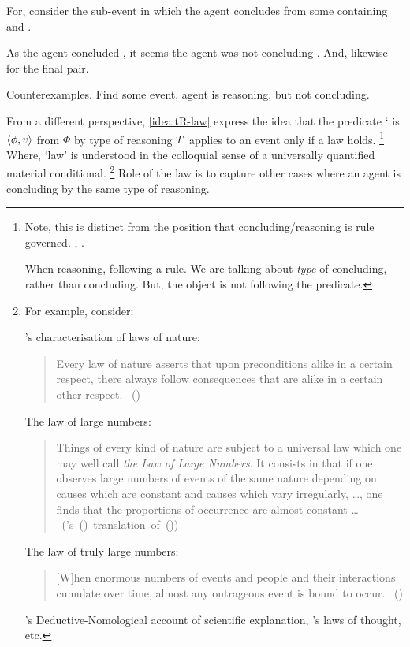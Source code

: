 \begin{note}
\begin{illustration}[Numbers]
    For, consider the sub-event in which the agent concludes  from some \pool{} containing  and .

    As the agent concluded , it seems the agent was not concluding .
    And, likewise for the final pair.
  \end{illustration}

  Counterexamples.
  Find some event, agent is reasoning, but not concluding.
\end{note}

\begin{note}
  From a different perspective, \autoref{idea:tR-law} express the idea that the predicate `\vAgent{} is \emph{\tCV{}} \(\langle \phi, v \rangle\) from \(\Phi\) by type of reasoning \(T\)' applies to an event only if a law holds.%
  \footnote{
    Note, this is distinct from the position that concluding/reasoning is rule governed.
    \cite{Boghossian:2008vf,Boghossian:2012vb}, \cite{Broome:2002aa}.

    When reasoning, following a rule.
    We are talking about \emph{type} of concluding, rather than concluding.
    But, the object is not following the predicate.
  }
  Where, `law' is understood in the colloquial sense of a universally quantified material conditional.%
  \footnote{
    For example, consider:

    \citeauthor{Helmholtz:1977aa}'s characterisation of laws of nature:%
    \begin{quote}
      \nocite{Wilson:2006aa}
      Every law of nature asserts that upon preconditions alike in a certain respect, there always follow consequences that are alike in a certain other respect.%
      \mbox{ }\hfill\mbox{(\citeyear[122]{Helmholtz:1977aa})}
    \end{quote}
    The law of large numbers:
    \begin{quote}
      Things of every kind of nature are subject to a universal law which one may well call \emph{the Law of Large Numbers}.
      It consists in that if one observes large numbers of events of the same nature depending on causes which are constant and causes which vary irregularly, \dots, one finds that the proportions of occurrence are almost constant \dots\newline
      \mbox{ }\hfill\mbox{(\citeauthor{Seneta:2013aa}'s (\citeyear[9--10]{Seneta:2013aa}) translation of (\cite[7]{Poisson:1837aa}))}
    \end{quote}
    The law of truly large numbers:
    \begin{quote}
      [W]hen enormous numbers of events and people and their interactions cumulate over time, almost any outrageous event is bound to occur.%
      \mbox{ }\hfill\mbox{(\cite[853]{Diaconis:1989aa})}
    \end{quote}
    \citeauthor{Hempel:1965aa}'s Deductive-Nomological account of scientific explanation, \citeauthor{Boole:1854aa}'s laws of thought, etc.
  }
  Role of the law is to capture other cases where an agent is concluding by the same type of reasoning.


\end{note}
